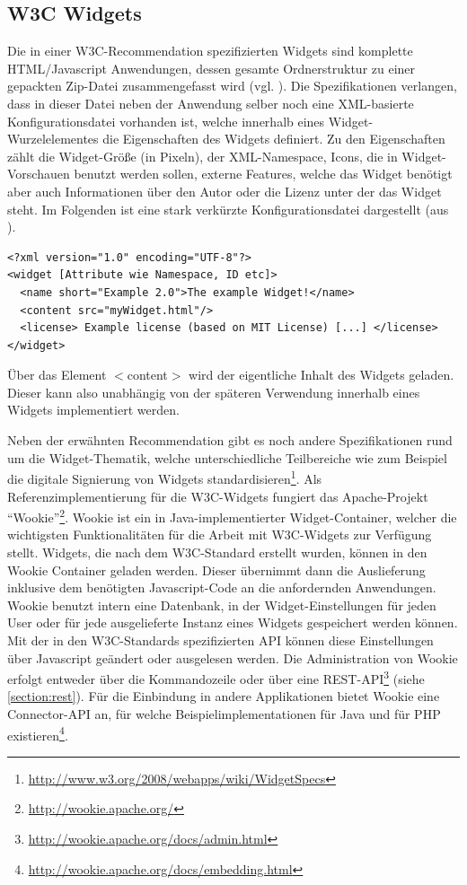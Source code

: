 \subsection{W3C Widgets}\label{section:w3c_widgets}
Die in einer W3C-Recommendation spezifizierten Widgets sind komplette HTML/Javascript Anwendungen, dessen gesamte Ordnerstruktur zu einer gepackten Zip-Datei zusammengefasst wird (vgl. \cite{W3C-11-2012}). Die Spezifikationen verlangen, dass in dieser Datei neben der Anwendung selber noch eine XML-basierte Konfigurationsdatei vorhanden ist, welche innerhalb eines Widget-Wurzelelementes die Eigenschaften des Widgets definiert. Zu den Eigenschaften zählt die Widget-Größe (in Pixeln), der XML-Namespace, Icons, die in Widget-Vorschauen benutzt werden sollen, externe Features, welche das Widget benötigt aber auch Informationen über den Autor oder die Lizenz unter der das Widget steht. Im Folgenden ist eine stark verkürzte Konfigurationsdatei dargestellt (aus \cite{W3C-11-2012}).
\begin{lstlisting}
<?xml version="1.0" encoding="UTF-8"?>
<widget [Attribute wie Namespace, ID etc]>
  <name short="Example 2.0">The example Widget!</name>
  <content src="myWidget.html"/>
  <license> Example license (based on MIT License) [...] </license>
</widget>
\end{lstlisting}
Über das Element $<$content$>$ wird der eigentliche Inhalt des Widgets geladen. Dieser kann also unabhängig von der späteren Verwendung innerhalb eines Widgets implementiert werden.

Neben der erwähnten Recommendation gibt es noch andere Spezifikationen rund um die Widget-Thematik, welche unterschiedliche Teilbereiche wie zum Beispiel die digitale Signierung von Widgets standardisieren\footnote{\url{http://www.w3.org/2008/webapps/wiki/WidgetSpecs}}. Als Referenzimplementierung für die W3C-Widgets fungiert das Apache-Projekt "`Wookie"'\footnote{\url{http://wookie.apache.org/}}. Wookie ist ein in Java-implementierter Widget-Container, welcher die wichtigsten Funktionalitäten für die Arbeit mit W3C-Widgets zur Verfügung stellt. Widgets, die nach dem W3C-Standard erstellt wurden, können in den Wookie Container geladen werden. Dieser übernimmt dann die Auslieferung inklusive dem benötigten Javascript-Code an die anfordernden Anwendungen. Wookie benutzt intern eine Datenbank, in der Widget-Einstellungen für jeden User oder für jede ausgelieferte Instanz eines Widgets gespeichert werden können. Mit der in den W3C-Standards spezifizierten API können diese Einstellungen über Javascript geändert oder ausgelesen werden. Die Administration von Wookie erfolgt entweder über die Kommandozeile oder über eine REST-API\footnote{\url{http://wookie.apache.org/docs/admin.html}} (siehe \ref{section:rest}). Für die Einbindung in andere Applikationen bietet Wookie eine Connector-API an, für welche Beispielimplementationen für Java und für PHP existieren\footnote{\url{http://wookie.apache.org/docs/embedding.html}}.

